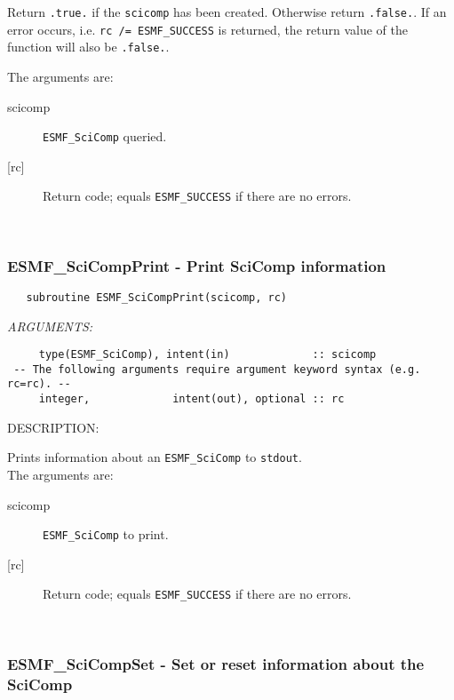      Return {\tt .true.} if the {\tt scicomp} has been created. Otherwise return
     {\tt .false.}. If an error occurs, i.e. {\tt rc /= ESMF\_SUCCESS} is
     returned, the return value of the function will also be {\tt .false.}.
  
   The arguments are:
     \begin{description}
     \item[scicomp]
       {\tt ESMF\_SciComp} queried.
     \item[{[rc]}]
       Return code; equals {\tt ESMF\_SUCCESS} if there are no errors.
     \end{description}
   
 
\mbox{}\hrulefill\ 
 
\subsubsection [ESMF\_SciCompPrint] {ESMF\_SciCompPrint - Print SciComp information}


  
\begin{verbatim}   subroutine ESMF_SciCompPrint(scicomp, rc)\end{verbatim}{\em ARGUMENTS:}
\begin{verbatim}     type(ESMF_SciComp), intent(in)             :: scicomp
 -- The following arguments require argument keyword syntax (e.g. rc=rc). --
     integer,             intent(out), optional :: rc\end{verbatim}
{\sf DESCRIPTION:\\ }


   Prints information about an {\tt ESMF\_SciComp} to {\tt stdout}. \\
  
   The arguments are:
   \begin{description}
   \item[scicomp]
     {\tt ESMF\_SciComp} to print.
   \item[{[rc]}]
     Return code; equals {\tt ESMF\_SUCCESS} if there are no errors.
   \end{description}
   
 
\mbox{}\hrulefill\ 
 
\subsubsection [ESMF\_SciCompSet] {ESMF\_SciCompSet - Set or reset information about the SciComp}


